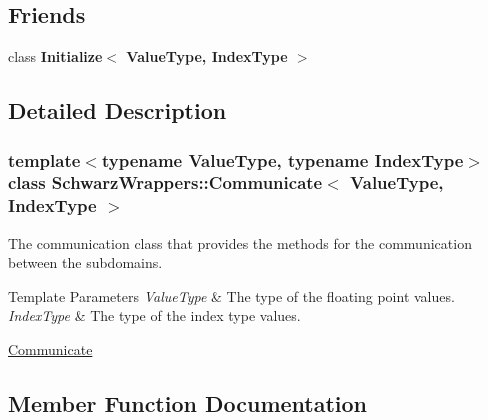 \subsection*{Friends}
\begin{DoxyCompactItemize}
\item 
\mbox{\label{classSchwarzWrappers_1_1Communicate_a7044b349fe5363eeace2d1a56b38f650}} 
class {\bfseries Initialize$<$ Value\+Type, Index\+Type $>$}
\end{DoxyCompactItemize}


\subsection{Detailed Description}
\subsubsection*{template$<$typename Value\+Type, typename Index\+Type$>$\newline
class Schwarz\+Wrappers\+::\+Communicate$<$ Value\+Type, Index\+Type $>$}

The communication class that provides the methods for the communication between the subdomains. 


\begin{DoxyTemplParams}{Template Parameters}
{\em Value\+Type} & The type of the floating point values. \\
\hline
{\em Index\+Type} & The type of the index type values.\\
\hline
\end{DoxyTemplParams}
\hyperlink{group__comm}{Communicate} 

\subsection{Member Function Documentation}
\mbox{\label{classSchwarzWrappers_1_1Communicate_af6ef7b0a4d98427c8c0ea4f4244b08d1}} 
